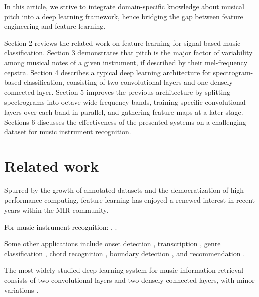 \documentclass{article}
\begin{document}
In this article, we strive to integrate domain-specific knowledge about musical
pitch into a deep learning framework, hence bridging the gap between feature
engineering and feature learning.


Section 2 reviews the related work on feature learning for signal-based music
classification.
Section 3 demonstrates that pitch is the major factor of variability among musical
notes of a given instrument, if described by their mel-frequency cepstra.
Section 4 describes a typical deep learning architecture for spectrogram-based
classification, consisting of two convolutional layers and one densely connected layer.
Section 5 improves the previous architecture by splitting spectrograms into
octave-wide frequency bands, training specific convolutional layers over each band
in parallel, and gathering feature maps at a later stage.
Sections 6 discusses the effectiveness of the presented systems on a challenging
dataset for music instrument recognition.

\section{Related work}
Spurred by the growth of annotated datasets and the democratization of
high-performance computing, feature learning has enjoyed a renewed interest
in recent years within the MIR community.

For music instrument recognition: \cite{McFee2015-muda}, \cite{Li2015}.

Some other applications include onset detection \cite{Schluter2014},
transcription \cite{Sigtia2015}, genre classification \cite{Choi2015},
chord recognition \cite{Humphrey2012}, boundary detection \cite{Ullrich2014}, and
recommendation \cite{vandenOord2013}.

The most widely studied deep learning system for music information retrieval consists of two convolutional layers and two densely connected layers, with minor variations \cite{Humphrey2012, Kereliuk2015, Li2015, McFee2015-muda, Schluter2014, Ullrich2014}.

\end{document}

